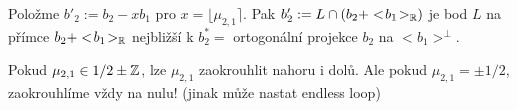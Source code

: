 \begin{note}
Položme $b'_2 := b_2 - xb_1$ pro $x = \lfloor \mu_{2,1} \rceil$. Pak $b'_2 := L \cap (b_2 + <\!b_1\!>_{\operatorname{\mathbb{R}}})$ je bod $L$ na přímce $b_2 + <\!b_1\!>_{\operatorname{\mathbb{R}}}$ nejbližší k $b_2^* = $ ortogonální projekce $b_2$ na $<\!b_1\!>^\perp$.
\end{note}

\begin{note}[Zaokrouhlení]
Pokud $\mu_{2,1}\in 1/2 \pm \operatorname{\mathbb{Z}}$, lze $\mu_{2,1}$ zaokrouhlit nahoru i dolů. Ale pokud $\mu_{2,1}=\pm 1/2$, zaokrouhlíme vždy na nulu! (jinak může nastat endless loop)
\end{note}